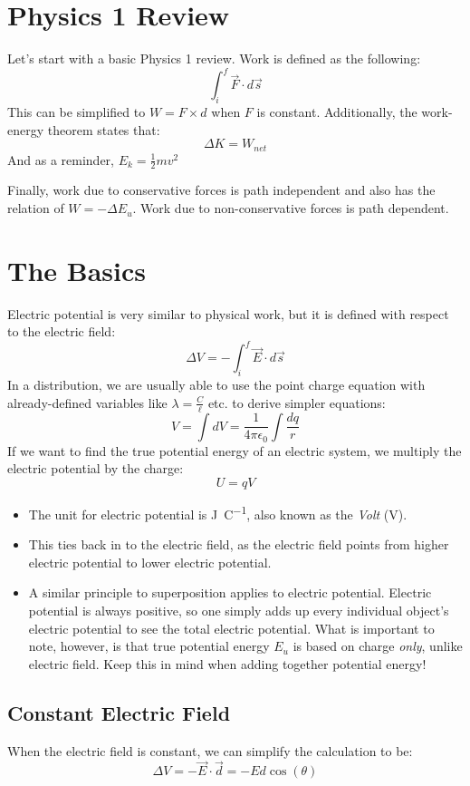 \documentclass[]{article}
\begin{document}
\section{Physics 1 Review}
Let's start with a basic Physics 1 review. Work is defined as the following:
\[ \int_{i}^{f} \vec{F} \cdot d\vec{s} \]
This can be simplified to $ W = F \times d $ when $ F $ is constant. Additionally, the work-energy theorem states that:
\[ \Delta K = W_{net} \]
And as a reminder, $ E_k = \frac{1}{2}mv^2 $

Finally, work due to conservative forces is path independent and also has the relation of $ W = - \Delta E_u $. Work due to non-conservative forces is path dependent.

\section{The Basics}
Electric potential is very similar to physical work, but it is defined with respect to the electric field:
\[ \Delta V = - \int_{i}^{f}\vec{E} \cdot d\vec{s} \]
In a distribution, we are usually able to use the point charge equation with already-defined variables like $ \lambda = \frac{C}{\ell} $ etc. to derive simpler equations:
\[ V = \int dV = \frac{1}{4\pi\epsilon_0} \int \frac{dq}{r} \]
If we want to find the true potential energy of an electric system, we multiply the electric potential by the charge:
\[ U = qV \]
\begin{itemize}
  \item The unit for electric potential is \unit{\joule\per\coulomb}, also known as the \emph{Volt} (\unit{\volt}).
  \item This ties back in to the electric field, as the electric field points from higher electric potential to lower electric potential.
  \item A similar principle to superposition applies to electric potential. Electric potential is always positive, so one simply adds up every individual object's electric potential to see the total electric potential. What is important to note, however, is that true potential energy $ E_u $ is based on charge \emph{only}, unlike electric field. Keep this in mind when adding together potential energy!
\end{itemize}

\subsection{Constant Electric Field}
When the electric field is constant, we can simplify the calculation to be:
\[ \Delta V = - \vec{E} \cdot \vec{d}  = - Ed\cos(\theta) \]
\end{document}
